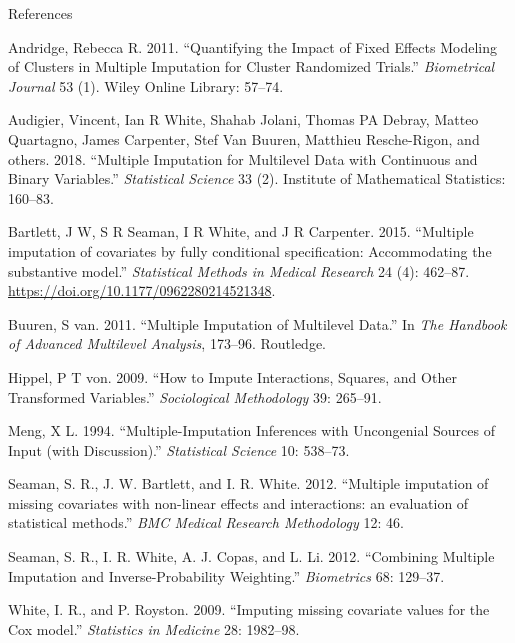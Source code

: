 \documentclass[ignorenonframetext,]{beamer}
\begin{document}
\begin{frame}[allowframebreaks]{References}
\protect\hypertarget{references}{}

\hypertarget{refs}{}
\leavevmode\hypertarget{ref-Andridge2011}{}%
Andridge, Rebecca R. 2011. ``Quantifying the Impact of Fixed Effects
Modeling of Clusters in Multiple Imputation for Cluster Randomized
Trials.'' \emph{Biometrical Journal} 53 (1). Wiley Online Library:
57--74.

\leavevmode\hypertarget{ref-audigier2018multiple}{}%
Audigier, Vincent, Ian R White, Shahab Jolani, Thomas PA Debray, Matteo
Quartagno, James Carpenter, Stef Van Buuren, Matthieu Resche-Rigon, and
others. 2018. ``Multiple Imputation for Multilevel Data with Continuous
and Binary Variables.'' \emph{Statistical Science} 33 (2). Institute of
Mathematical Statistics: 160--83.

\leavevmode\hypertarget{ref-Bartlett2014}{}%
Bartlett, J W, S R Seaman, I R White, and J R Carpenter. 2015.
``Multiple imputation of covariates by fully conditional specification:
Accommodating the substantive model.'' \emph{Statistical Methods in
Medical Research} 24 (4): 462--87.
\url{https://doi.org/10.1177/0962280214521348}.

\leavevmode\hypertarget{ref-vanBuuren2011}{}%
Buuren, S van. 2011. ``Multiple Imputation of Multilevel Data.'' In
\emph{The Handbook of Advanced Multilevel Analysis}, 173--96. Routledge.

\leavevmode\hypertarget{ref-Hippel2009}{}%
Hippel, P T von. 2009. ``How to Impute Interactions, Squares, and Other
Transformed Variables.'' \emph{Sociological Methodology} 39: 265--91.

\leavevmode\hypertarget{ref-Meng:1994}{}%
Meng, X L. 1994. ``Multiple-Imputation Inferences with Uncongenial
Sources of Input (with Discussion).'' \emph{Statistical Science} 10:
538--73.

\leavevmode\hypertarget{ref-Seaman2012}{}%
Seaman, S. R., J. W. Bartlett, and I. R. White. 2012. ``Multiple
imputation of missing covariates with non-linear effects and
interactions: an evaluation of statistical methods.'' \emph{BMC Medical
Research Methodology} 12: 46.

\leavevmode\hypertarget{ref-Seaman2012a}{}%
Seaman, S. R., I. R. White, A. J. Copas, and L. Li. 2012. ``Combining
Multiple Imputation and Inverse-Probability Weighting.''
\emph{Biometrics} 68: 129--37.

\leavevmode\hypertarget{ref-White2009}{}%
White, I. R., and P. Royston. 2009. ``Imputing missing covariate values
for the Cox model.'' \emph{Statistics in Medicine} 28: 1982--98.

\end{frame}
\end{document}
